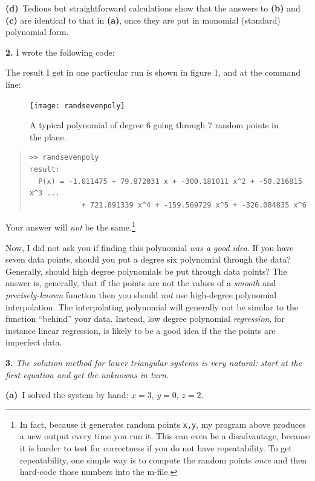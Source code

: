 \documentclass[11pt]{amsart}
\newcommand{\mfile}[1]{
\begin{quote}
\bigskip
\VerbatimInput[frame=single,label=\fbox{\normalsize \textsl{\,#1\,}},fontfamily=courier,fontsize=\scriptsize]{#1}
\end{quote}
}
\newcommand{\epart}[1]{\medskip\noindent\quad\textbf{(#1)}\, }
\newcommand{\prob}[1]{\medskip\noindent\textbf{#1.}\quad }
\begin{document}
\epart{d} Tedious but straightforward calculations show that the answers to \textbf{(b)} and \textbf{(c)} are identical to that in \textbf{(a)}, once they are put in monomial (standard) polynomial form.

\prob{2}  I wrote the following code:

\mfile{randsevenpoly.m}

The result I get in one particular run is shown in figure 1, and at the command line:

\begin{figure}[ht]
\texttt{[image: randsevenpoly]}
\caption{A typical polynomial of degree 6 going through 7 random points in the plane.}
\end{figure}

\small \begin{quote}\begin{Verbatim}
>> randsevenpoly
result:
  P(x) = -1.011475 + 79.872031 x + -300.181011 x^2 + -50.216815 x^3 ...
            + 721.891339 x^4 + -159.569729 x^5 + -326.084835 x^6
\end{Verbatim}
\end{quote} \normalsize

Your answer will \emph{not} be the same.\footnote{In fact, because it generates random points \texttt{x,y}, my program above produces a new output every time you run it.  This can even be a disadvantage, because it is harder to test for correctness if you do not have repeatability.  To get repeatability, one simple way is to compute the random points \emph{once} and then hard-code those numbers into the m-file.}

Now, I did not ask you if finding this polynomial \emph{was a good idea}.  If you have seven data points, should you put a degree six polynomial through the data?  Generally, should high degree polynomials be put through data points?  The answer is, generally, that if the points are not the values of a \emph{smooth} and \emph{precisely-known} function then you should \emph{not} use high-degree polynomial interpolation.  The interpolating polynomial will generally not be similar to the function ``behind'' your data.  Instead, low degree polynomial \emph{regression}, for instance linear regression, is likely to be a good idea if the the points are imperfect data. 

\prob{3} \emph{The solution method for lower triangular systems is very natural: start at the first equation and get the unknowns in turn.}

\epart{a} I solved the system by hand: $x=3$, $y=0$, $z=2$.
\end{document}
